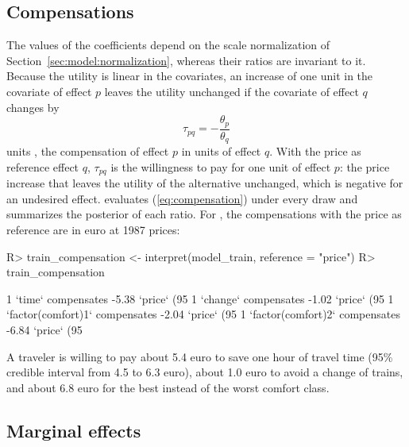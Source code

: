 \documentclass[article,shortnames]{jss}
\newcommand{\fct}[1]{\code{#1()}}
\begin{document}
\subsection{Compensations} \label{sec:compensations}

The values of the coefficients depend on the scale normalization of
Section~\ref{sec:model:normalization}, whereas their ratios are invariant to it.
Because the utility is linear in the covariates, an increase of one unit in the
covariate of effect $p$ leaves the utility unchanged if the covariate of effect
$q$ changes by
%
\begin{equation}
\label{eq:compensation}
\tau_{pq} = -\frac{\theta_p}{\theta_q}
\end{equation}
%
units \citep{Train2009}, the compensation of effect $p$ in units of effect $q$.
With the price as reference effect $q$, $\tau_{pq}$ is the willingness to pay
for one unit of effect $p$: the price increase that leaves the utility of the
alternative unchanged, which is negative for an undesired effect.
\fct{interpret} evaluates (\ref{eq:compensation}) under every draw and
summarizes the posterior of each ratio. For , the
compensations with the price as reference are in euro at 1987 prices:
%
\begin{Schunk}
\begin{Sinput}
R> train_compensation <- interpret(model_train, reference = "price")
R> train_compensation
\end{Sinput}
\begin{Soutput}
1 `time` compensates -5.38 `price` (95%
1 `change` compensates -1.02 `price` (95%
1 `factor(comfort)1` compensates -2.04 `price` (95%
1 `factor(comfort)2` compensates -6.84 `price` (95%
\end{Soutput}
\end{Schunk}
%
A traveler is willing to pay about 5.4 euro to save one hour of travel time
(95\% credible interval from 4.5 to 6.3 euro), about 1.0 euro to avoid a change
of trains, and about 6.8 euro for the best instead of the worst comfort class.

\subsection{Marginal effects}
\end{document}
